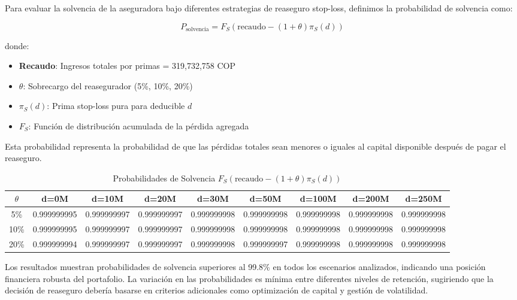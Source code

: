 Para evaluar la solvencia de la aseguradora bajo diferentes estrategias de reaseguro stop-loss, definimos la probabilidad de solvencia como:

$$P_{\text{solvencia}} = F_S(\text{recaudo} - (1+\theta)\pi_S(d))$$

donde:
\begin{itemize}
\item \textbf{Recaudo}: Ingresos totales por primas = 319,732,758 COP
\item \textbf{$\theta$}: Sobrecargo del reasegurador (5\%, 10\%, 20\%)
\item \textbf{$\pi_S(d)$}: Prima stop-loss pura para deducible $d$
\item \textbf{$F_S$}: Función de distribución acumulada de la pérdida agregada
\end{itemize}

Esta probabilidad representa la probabilidad de que las pérdidas totales sean menores o iguales al capital disponible después de pagar el reaseguro.

\begin{table}[H]
\centering
\caption{Probabilidades de Solvencia $F_S(\text{recaudo} - (1+\theta)\pi_S(d))$}
\scriptsize
\begin{tabular}{|c|c|c|c|c|c|c|c|c|}
\hline
\textbf{$\theta$} & \textbf{d=0M} & \textbf{d=10M} & \textbf{d=20M} & \textbf{d=30M} & \textbf{d=50M} & \textbf{d=100M} & \textbf{d=200M} & \textbf{d=250M} \\
\hline
5\% & 0.999999995 & 0.999999997 & 0.999999997 & 0.999999998 & 0.999999998 & 0.999999998 & 0.999999998 & 0.999999998 \\
10\% & 0.999999995 & 0.999999997 & 0.999999997 & 0.999999998 & 0.999999998 & 0.999999998 & 0.999999998 & 0.999999998 \\
20\% & 0.999999994 & 0.999999997 & 0.999999997 & 0.999999998 & 0.999999997 & 0.999999998 & 0.999999998 & 0.999999998 \\
\hline
\end{tabular}
\end{table}

Los resultados muestran probabilidades de solvencia superiores al 99.8\% en todos los escenarios analizados, indicando una posición financiera robusta del portafolio. La variación en las probabilidades es mínima entre diferentes niveles de retención, sugiriendo que la decisión de reaseguro debería basarse en criterios adicionales como optimización de capital y gestión de volatilidad.



